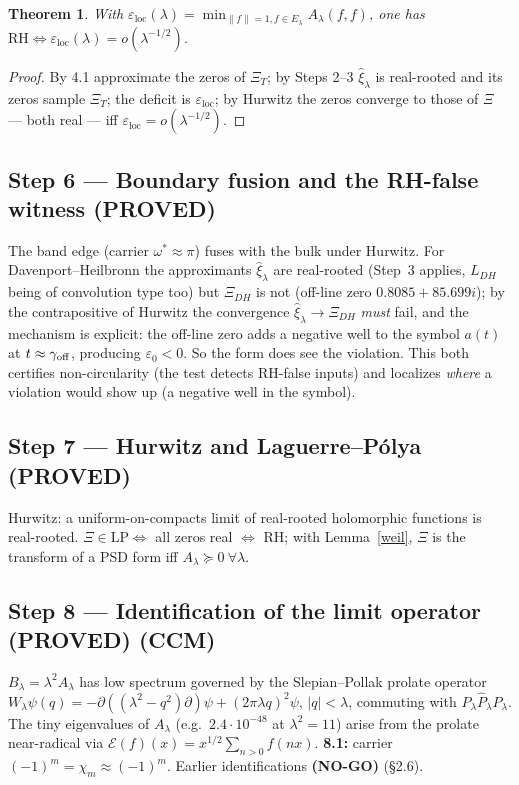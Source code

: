 \documentclass[11pt]{article}
\newtheorem{theorem}{Theorem}[section]
\theoremstyle{remark}
\newcommand{\ve}{\varepsilon}
\newcommand{\loc}{\mathrm{loc}}
\newcommand{\PROVED}{\textbf{(PROVED)}}
\newcommand{\NOGO}{\textbf{(NO-GO)}}
\begin{document}
\begin{theorem}
With $\ve_\loc(\lambda)=\min_{\|f\|=1,f\in E_\lambda}A_\lambda(f,f)$, one has
$\mathrm{RH}\iff\ve_\loc(\lambda)=o(\lambda^{-1/2})$.
\end{theorem}
\begin{proof}
By 4.1 approximate the zeros of $\Xi_T$; by Steps 2--3 $\hat\xi_\lambda$ is real-rooted and its
zeros sample $\Xi_T$; the deficit is $\ve_\loc$; by Hurwitz the zeros converge to those of $\Xi$
--- both real --- iff $\ve_\loc=o(\lambda^{-1/2})$.
\end{proof}

\subsection{Step 6 --- Boundary fusion and the RH-false witness \PROVED}

The band edge (carrier $\omega^*\approx\pi$) fuses with the bulk under Hurwitz. For
Davenport--Heilbronn the approximants $\hat\xi_\lambda$ are real-rooted (Step~3 applies, $L_{DH}$
being of convolution type too) but $\Xi_{DH}$ is not (off-line zero $0.8085+85.699i$); by the
contrapositive of Hurwitz the convergence $\hat\xi_\lambda\to\Xi_{DH}$ \emph{must} fail, and the
mechanism is explicit: the off-line zero adds a negative well to the symbol $a(t)$ at
$t\approx\gamma_{\rm off}$, producing $\ve_0<0$. So the form does see the violation. This both
certifies non-circularity (the test detects RH-false inputs) and localizes \emph{where} a
violation would show up (a negative well in the symbol).

\subsection{Step 7 --- Hurwitz and Laguerre--P\'olya \PROVED}

Hurwitz: a uniform-on-compacts limit of real-rooted holomorphic functions is real-rooted.
$\Xi\in\mathrm{LP}\iff$ all zeros real $\iff$ RH; with Lemma~\ref{weil}, $\Xi$ is the transform
of a PSD form iff $A_\lambda\succeq0\ \forall\lambda$.

\subsection{Step 8 --- Identification of the limit operator \PROVED{} (CCM)}

$B_\lambda=\lambda^2A_\lambda$ has low spectrum governed by the Slepian--Pollak prolate operator
$W_\lambda\psi(q)=-\partial((\lambda^2-q^2)\partial)\psi+(2\pi\lambda q)^2\psi$, $|q|<\lambda$,
commuting with $P_\lambda\widehat P_\lambda P_\lambda$. The tiny eigenvalues of $A_\lambda$ (e.g.\
$2.4\cdot10^{-48}$ at $\lambda^2{=}11$) arise from the prolate near-radical via
$\mathcal E(f)(x)=x^{1/2}\sum_{n>0}f(nx)$. \textbf{8.1:} carrier $(-1)^m=\chi_m\approx(-1)^m$.
Earlier identifications \NOGO{} (\S2.6).
\end{document}
